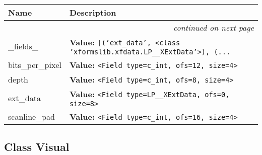     \vspace{-1cm}
\hspace{\varindent}\begin{longtable}{|p{\varnamewidth}|p{\vardescrwidth}|l}
\cline{1-2}
\cline{1-2} \centering \textbf{Name} & \centering \textbf{Description}& \\
\cline{1-2}
\endhead\cline{1-2}\multicolumn{3}{r}{\small\textit{continued on next page}}\\\endfoot\cline{1-2}
\endlastfoot\raggedright \_\-f\-i\-e\-l\-d\-s\-\_\- & \raggedright \textbf{Value:} 
{\tt \texttt{[}\texttt{(}\texttt{'}\texttt{ext\_data}\texttt{'}\texttt{, }{\textless}class 'xformslib.xfdata.LP\_\_XExtData'{\textgreater}\texttt{)}\texttt{, }\texttt{(}\texttt{...}}&\\
\cline{1-2}
\raggedright b\-i\-t\-s\-\_\-p\-e\-r\-\_\-p\-i\-x\-e\-l\- & \raggedright \textbf{Value:} 
{\tt {\textless}Field type=c\_int, ofs=12, size=4{\textgreater}}&\\
\cline{1-2}
\raggedright d\-e\-p\-t\-h\- & \raggedright \textbf{Value:} 
{\tt {\textless}Field type=c\_int, ofs=8, size=4{\textgreater}}&\\
\cline{1-2}
\raggedright e\-x\-t\-\_\-d\-a\-t\-a\- & \raggedright \textbf{Value:} 
{\tt {\textless}Field type=LP\_\_XExtData, ofs=0, size=8{\textgreater}}&\\
\cline{1-2}
\raggedright s\-c\-a\-n\-l\-i\-n\-e\-\_\-p\-a\-d\- & \raggedright \textbf{Value:} 
{\tt {\textless}Field type=c\_int, ofs=16, size=4{\textgreater}}&\\
\cline{1-2}
\end{longtable}



\subsection{Class Visual}

